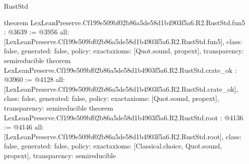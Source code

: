 \begin{lexlean}{RustStd}
\begin{coremodule}
{}
theorem LexLeanPreserve.Cf199e509bf02b86a5de58d1b4903f5a6.R2.RustStd.fun5 : @3639 := @3956 {
  all: [LexLeanPreserve.Cf199e509bf02b86a5de58d1b4903f5a6.R2.RustStd.fun5],
  class: false,
  generated: false,
  policy: exact{axioms: [Quot.sound, propext]},
  transparency: semireducible
}
theorem LexLeanPreserve.Cf199e509bf02b86a5de58d1b4903f5a6.R2.RustStd.crate_ok : @3960 := @4128 {
  all: [LexLeanPreserve.Cf199e509bf02b86a5de58d1b4903f5a6.R2.RustStd.crate_ok],
  class: false,
  generated: false,
  policy: exact{axioms: [Quot.sound, propext]},
  transparency: semireducible
}
theorem LexLeanPreserve.Cf199e509bf02b86a5de58d1b4903f5a6.R2.RustStd.root : @4136 := @4146 {
  all: [LexLeanPreserve.Cf199e509bf02b86a5de58d1b4903f5a6.R2.RustStd.root],
  class: false,
  generated: false,
  policy: exact{axioms: [Classical.choice, Quot.sound, propext]},
  transparency: semireducible
}


\end{coremodule}
\end{lexlean}
